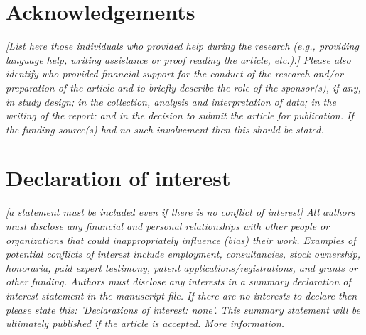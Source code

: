 \documentclass[11pt, letterpaper]{article}
\begin{document}
{\section{Acknowledgements}

\textit{[List here those individuals who provided help during the research (e.g., providing language help, writing assistance or proof reading the article, etc.).] Please also identify who provided financial support for the conduct of the research and/or preparation of the article and to briefly describe the role of the sponsor(s), if any, in study design; in the collection, analysis and interpretation of data; in the writing of the report; and in the decision to submit the article for publication. If the funding source(s) had no such involvement then this should be stated.}

\section{Declaration of interest}

\textit{[a statement must be included even if there is no conflict of interest] \linebreak
All authors must disclose any financial and personal relationships with other people or organizations that could inappropriately influence (bias) their work. Examples of potential conflicts of interest include employment, consultancies, stock ownership, honoraria, paid expert testimony, patent applications/registrations, and grants or other funding. Authors must disclose any interests in a summary declaration of interest statement in the manuscript file. If there are no interests to declare then please state this: 'Declarations of interest: none'. This summary statement will be ultimately published if the article is accepted. More information.}

}
\end{document}
